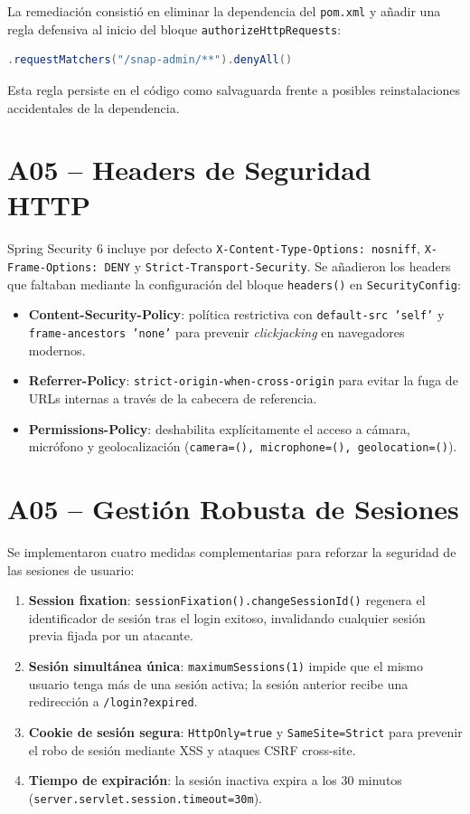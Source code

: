 \documentclass[12pt, a4paper]{report}
\begin{document}
La remediación consistió en eliminar la dependencia del \texttt{pom.xml} y a\~nadir una regla defensiva al inicio del bloque \texttt{authorizeHttpRequests}:

\begin{lstlisting}[language=Java]
.requestMatchers("/snap-admin/**").denyAll()
\end{lstlisting}

Esta regla persiste en el código como salvaguarda frente a posibles reinstalaciones accidentales de la dependencia.

\section{A05 -- Headers de Seguridad HTTP}

Spring Security 6 incluye por defecto \texttt{X-Content-Type-Options: nosniff}, \texttt{X-Frame-Options: DENY} y \texttt{Strict-Transport-Security}. Se a\~nadieron los headers que faltaban mediante la configuración del bloque \texttt{headers()} en \texttt{SecurityConfig}:

\begin{itemize}
  \item \textbf{Content-Security-Policy}: política restrictiva con \texttt{default-src 'self'} y \texttt{frame-ancestors 'none'} para prevenir \textit{clickjacking} en navegadores modernos.
  \item \textbf{Referrer-Policy}: \texttt{strict-origin-when-cross-origin} para evitar la fuga de URLs internas a través de la cabecera de referencia.
  \item \textbf{Permissions-Policy}: deshabilita explícitamente el acceso a cámara, micrófono y geolocalización (\texttt{camera=(), microphone=(), geolocation=()}).
\end{itemize}

\section{A05 -- Gestión Robusta de Sesiones}

Se implementaron cuatro medidas complementarias para reforzar la seguridad de las sesiones de usuario:

\begin{enumerate}
  \item \textbf{Session fixation}: \texttt{sessionFixation().changeSessionId()} regenera el identificador de sesión tras el login exitoso, invalidando cualquier sesión previa fijada por un atacante.
  \item \textbf{Sesión simultánea única}: \texttt{maximumSessions(1)} impide que el mismo usuario tenga más de una sesión activa; la sesión anterior recibe una redirección a \texttt{/login?expired}.
  \item \textbf{Cookie de sesión segura}: \texttt{HttpOnly=true} y \texttt{SameSite=Strict} para prevenir el robo de sesión mediante XSS y ataques CSRF cross-site.
  \item \textbf{Tiempo de expiración}: la sesión inactiva expira a los 30 minutos (\texttt{server.servlet.session.timeout=30m}).
\end{enumerate}
\end{document}
